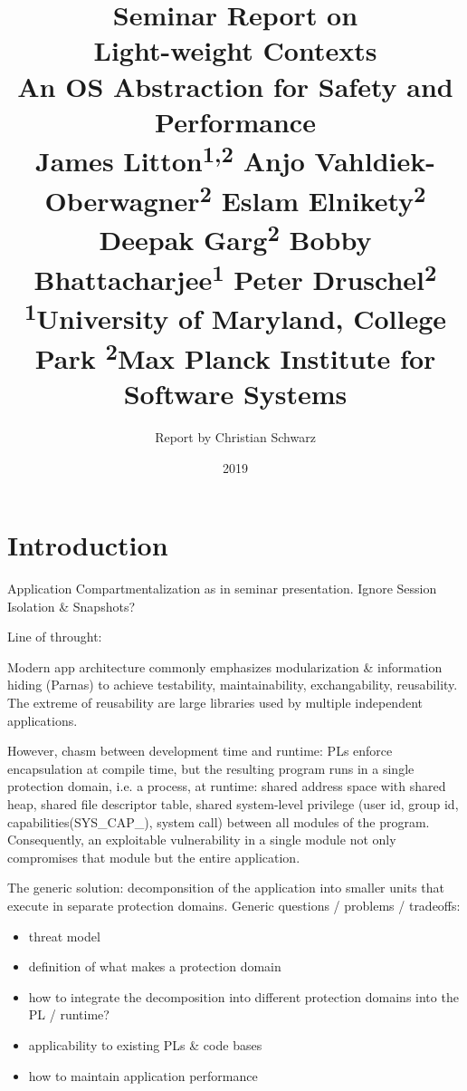 \documentclass[10pt,twocolumn,letter]{article}
\begin{document}
\title{%
  {\normalfont \normalsize Seminar Report on}\\%
  Light-weight Contexts\\%
  {\normalfont \normalsize An OS Abstraction for Safety and Performance}\\%
  {\normalfont \small %
    James Litton\textsuperscript{1,2}
    Anjo Vahldiek-Oberwagner\textsuperscript{2}
    Eslam Elnikety\textsuperscript{2}
    Deepak Garg\textsuperscript{2}
    Bobby Bhattacharjee\textsuperscript{1}
    Peter Druschel\textsuperscript{2}
  }\\
  {\normalfont \small
    \textsuperscript{1}University of Maryland, College Park 
    \textsuperscript{2}Max Planck Institute for Software Systems
  }%
}
\author{Report by Christian Schwarz}
\date{2019}

\maketitle

\begin{abstract}
  \blindtext
\end{abstract}

\section{Introduction}\label{intro}

Application Compartmentalization as in seminar presentation. Ignore Session Isolation \& Snapshots?

Line of throught:

Modern app architecture commonly emphasizes modularization \& information hiding (Parnas) to achieve testability, maintainability, exchangability, reusability.
The extreme of reusability are large libraries used by multiple independent applications.

However, chasm between development time and runtime:
PLs enforce encapsulation at compile time, but the resulting program runs in a single protection domain, i.e. a process, at runtime:
shared address space with shared heap, shared file descriptor table, shared system-level privilege (user id, group id, capabilities(SYS\_CAP\_), system call) between all modules of the program.
Consequently, an exploitable vulnerability in a single module not only compromises that module but the entire application.

The generic solution: decomponsition of the application into smaller units that execute in separate protection domains.
Generic questions / problems / tradeoffs:
\begin{itemize}
  \item threat model
  \item definition of what makes a protection domain
  \item how to integrate the decomposition into different protection domains into the PL / runtime?
  \item applicability to existing PLs \& code bases
  \item how to maintain application performance
\end{itemize}
\end{document}
